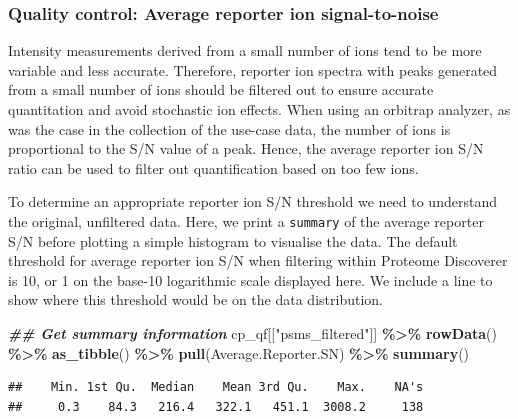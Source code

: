 \documentclass[9pt,a4paper,]{extarticle}
\newenvironment{Shaded}{\begin{snugshade}}{\end{snugshade}}
\newcommand{\DocumentationTok}[1]{\textcolor[rgb]{0.56,0.35,0.01}{\textbf{\textit{#1}}}}
\newcommand{\FunctionTok}[1]{\textcolor[rgb]{0.13,0.29,0.53}{\textbf{#1}}}
\newcommand{\NormalTok}[1]{#1}
\newcommand{\SpecialCharTok}[1]{\textcolor[rgb]{0.81,0.36,0.00}{\textbf{#1}}}
\newcommand{\StringTok}[1]{\textcolor[rgb]{0.31,0.60,0.02}{#1}}
\begin{document}
\subsubsection{Quality control: Average reporter ion signal-to-noise}\label{quality-control-average-reporter-ion-signal-to-noise}

Intensity measurements derived from a small number of ions tend to be more
variable and less accurate. Therefore, reporter ion spectra with peaks generated
from a small number of ions should be filtered out to ensure accurate
quantitation and avoid stochastic ion effects. When using an orbitrap analyzer,
as was the case in the collection of the use-case data, the number of ions is
proportional to the S/N value of a peak. Hence, the average reporter ion S/N
ratio can be used to filter out quantification based on too few ions.

To determine an appropriate reporter ion S/N threshold we need to understand the
original, unfiltered data. Here, we print a \texttt{summary} of the average reporter
S/N before plotting a simple histogram to visualise the data. The default
threshold for average reporter ion S/N when filtering within Proteome Discoverer
is 10, or 1 on the base-10 logarithmic scale displayed here. We include a line
to show where this threshold would be on the data distribution.

\begin{Shaded}
\begin{Highlighting}[]
\DocumentationTok{\#\# Get summary information}
\NormalTok{cp\_qf[[}\StringTok{"psms\_filtered"}\NormalTok{]] }\SpecialCharTok{\%\textgreater{}\%} 
  \FunctionTok{rowData}\NormalTok{() }\SpecialCharTok{\%\textgreater{}\%} 
  \FunctionTok{as\_tibble}\NormalTok{() }\SpecialCharTok{\%\textgreater{}\%} 
  \FunctionTok{pull}\NormalTok{(Average.Reporter.SN) }\SpecialCharTok{\%\textgreater{}\%} 
  \FunctionTok{summary}\NormalTok{()}
\end{Highlighting}
\end{Shaded}

\begin{verbatim}
##    Min. 1st Qu.  Median    Mean 3rd Qu.    Max.    NA's 
##     0.3    84.3   216.4   322.1   451.1  3008.2     138
\end{verbatim}
\end{document}
